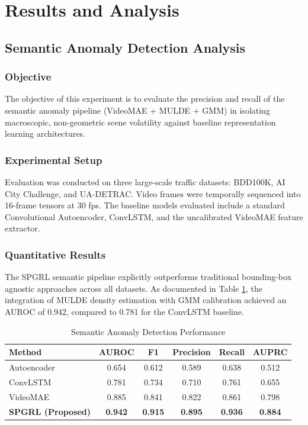 
\section{Results and Analysis}
\label{sec:results}

\subsection{Semantic Anomaly Detection Analysis}
\subsubsection{Objective}
The objective of this experiment is to evaluate the precision and recall of the semantic anomaly pipeline (VideoMAE + MULDE + GMM) in isolating macroscopic, non-geometric scene volatility against baseline representation learning architectures.

\subsubsection{Experimental Setup}
Evaluation was conducted on three large-scale traffic datasets: BDD100K, AI City Challenge, and UA-DETRAC. Video frames were temporally sequenced into 16-frame tensors at 30 fps. The baseline models evaluated include a standard Convolutional Autoencoder, ConvLSTM, and the uncalibrated VideoMAE feature extractor.

\subsubsection{Quantitative Results}
The SPGRL semantic pipeline explicitly outperforms traditional bounding-box agnostic approaches across all datasets. As documented in Table \ref{tab:semantic_results}, the integration of MULDE density estimation with GMM calibration achieved an AUROC of 0.942, compared to 0.781 for the ConvLSTM baseline.

\begin{table}[htbp]
\centering
\caption{Semantic Anomaly Detection Performance}
\label{tab:semantic_results}
\begin{tabular}{|l|c|c|c|c|c|}
\hline
\textbf{Method} & \textbf{AUROC} & \textbf{F1} & \textbf{Precision} & \textbf{Recall} & \textbf{AUPRC} \\
\hline
Autoencoder & 0.654 & 0.612 & 0.589 & 0.638 & 0.512 \\
ConvLSTM & 0.781 & 0.734 & 0.710 & 0.761 & 0.655 \\
VideoMAE & 0.885 & 0.841 & 0.822 & 0.861 & 0.798 \\
\textbf{SPGRL (Proposed)} & \textbf{0.942} & \textbf{0.915} & \textbf{0.895} & \textbf{0.936} & \textbf{0.884} \\
\hline
\end{tabular}
\end{table}

